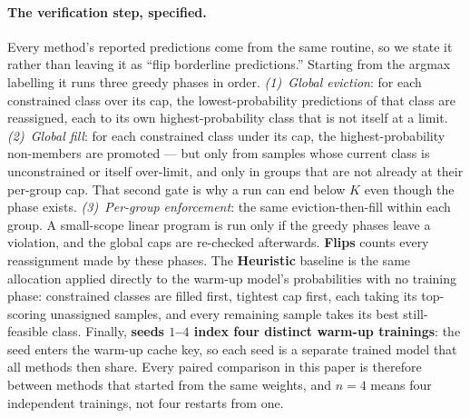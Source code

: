 \documentclass[10pt]{article}
\begin{document}
{
\paragraph{The verification step, specified.}
Every method's reported predictions come from the same routine, so we state it
rather than leaving it as ``flip borderline predictions.'' Starting from the
argmax labelling it runs three greedy phases in order. \emph{(1)~Global
eviction}: for each constrained class over its cap, the lowest-probability
predictions of that class are reassigned, each to its own highest-probability
class that is not itself at a limit. \emph{(2)~Global fill}: for each
constrained class under its cap, the highest-probability non-members are
promoted --- but only from samples whose current class is unconstrained or
itself over-limit, and only in groups that are not already at their per-group
cap. That second gate is why a run can end below $K$ even though the phase
exists. \emph{(3)~Per-group enforcement}: the same eviction-then-fill within
each group. A small-scope linear program is run only if the greedy phases leave
a violation, and the global caps are re-checked afterwards. \textbf{Flips} counts
every reassignment made by these phases. The \textbf{Heuristic} baseline is the
same allocation applied directly to the warm-up model's probabilities with no
training phase: constrained classes are filled first, tightest cap first, each
taking its top-scoring unassigned samples, and every remaining sample takes its
best still-feasible class. Finally, \textbf{seeds $1$--$4$ index four distinct
warm-up trainings}: the seed enters the warm-up cache key, so each seed is a
separate trained model that all methods then share. Every paired comparison in
this paper is therefore between methods that started from the same weights, and
$n{=}4$ means four independent trainings, not four restarts from one.
}
\end{document}
